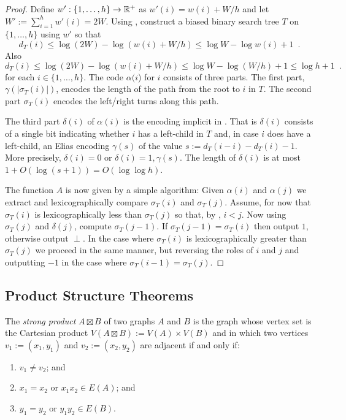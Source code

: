 \documentclass[kpfonts]{patmorin}
\begin{document}
\begin{proof}
  Define $w':\{1,\ldots,h\}\to \mathbb{R}^+$ as $w'(i)=w(i)+W/h$ and let $W':=\sum_{i=1}^h w'(i)=2W$.
  Using , construct a biased binary search tree $T$ on $\{1,\ldots,h\}$ using $w'$ so that 
  \[   
    d_T(i)\le\log (2W)-\log(w(i)+W/h) \le \log W-\log w(i)+1 \enspace .
  \]
  Also
  \[
  d_T(i)\le\log (2W)-\log(w(i)+W/h) \le \log W-\log (W/h)+1 \le \log h + 1\enspace .
  \]
  for each $i\in\{1,\ldots,h\}$.  The code $\alpha(i$) for $i$ consists of three parts.  The first part, $\gamma(|\sigma_T(i)|)$, encodes the length of the path from the root to $i$ in $T$. The second part $\sigma_T(i)$ encodes the left/right turns along this path.  
  
  The third part $\delta(i)$ of $\alpha(i)$ is the encoding implicit in .  That is $\delta(i)$ consists of
  a single bit indicating whether $i$ has a left-child in $T$ and, in case $i$ does have a left-child, an Elias encoding $\gamma(s)$ of the value $s:=d_T(i-i)-d_T(i)-1$.  More precisely, $\delta(i)=0$ or $\delta(i)=1,\gamma(s)$.  The length of $\delta(i)$ is at most $1+O(\log(s+1))=O(\log\log h)$.

  The function $A$ is now given by a simple algorithm: Given $\alpha(i)$ and $\alpha(j)$ we extract and lexicographically compare $\sigma_T(i)$ and $\sigma_T(j)$.  Assume, for now that $\sigma_T(i)$ is lexicographically less than $\sigma_T(j)$ so that, by , $i < j$.  Now using $\sigma_T(j)$ and $\delta(j)$, compute $\sigma_T(j-1)$.  If $\sigma_T(j-1)=\sigma_T(i)$ then output $1$, otherwise output $\perp$.
  In the case where $\sigma_T(i)$ is lexicographically greater than $\sigma_T(j)$ we proceed in the same manner, but reversing the roles of $i$ and $j$ and outputting $-1$ in the case where $\sigma_T(i-1)=\sigma_T(j)$.
\end{proof}

\subsection{Product Structure Theorems}

The \emph{strong product} $A\boxtimes B$ of two graphs $A$ and $B$ is the graph whose vertex set is the Cartesian product $V(A\boxtimes B):=V(A)\times V(B)$ and in which two vertices $v_1:=(x_1,y_1)$ and $v_2:=(x_2,y_2)$ are adjacent if and only if:
\begin{enumerate}
  \item  $v_1\neq v_2$; and
  \item $x_1=x_2$ or $x_1x_2\in E(A)$; and
  \item $y_1=y_2$ or $y_1y_2\in E(B)$.
\end{enumerate}
\end{document}
